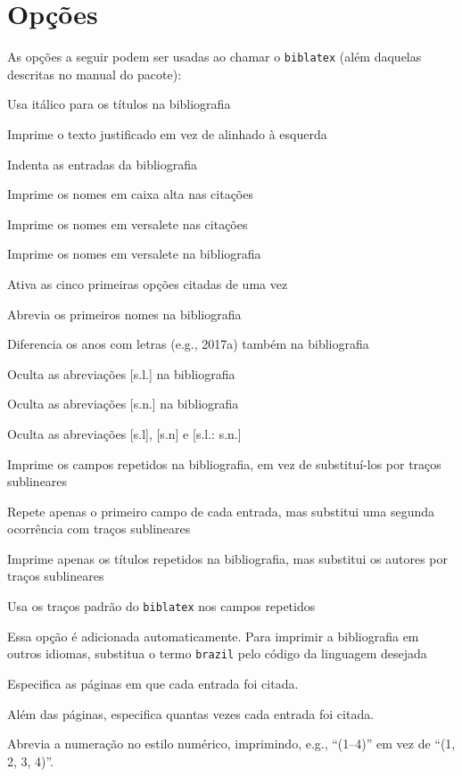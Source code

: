 \documentclass[a4paper]{article}
\begin{document}
\clearpage
\section{Opções}%
\label{sec:opções}

As opções a seguir podem ser usadas ao chamar o \texttt{biblatex} (além
daquelas descritas no manual do pacote):

\begin{description}[itemindent=-1em,leftmargin=3em]%
  \item [ittitles] Usa itálico para os títulos na bibliografia
  \item [justify] Imprime o texto justificado em vez de alinhado à esquerda
  \item [indent] Indenta as entradas da bibliografia
  \item [accite] Imprime os nomes em caixa alta nas citações
  \item [sccite] Imprime os nomes em versalete nas citações
  \item [scbib] Imprime os nomes em versalete na bibliografia
  \item [pretty] Ativa as cinco primeiras opções citadas de uma vez
  \item [giveninits] Abrevia os primeiros nomes na bibliografia
  \item [extrayear] Diferencia os anos com letras (e.g., 2017a)
    também na bibliografia
  \item [nosl] Oculta as abreviações [s.l.] na bibliografia
  \item [nosn] Oculta as abreviações [s.n.] na bibliografia
  \item [noslsn] Oculta as abreviações [s.l], [s.n] e [s.l.: s.n.]
  \item [repeatfields] Imprime os campos repetidos na bibliografia, em vez de
    subs\-ti\-tu\-í-los por traços sublineares
  \item [repeatfirstfields] Repete apenas o primeiro campo de cada entrada,
    mas substitui uma segunda ocorrência com traços sublineares
  \item [repeattitles] Imprime apenas os títulos repetidos na bibliografia,
    mas substitui os autores por traços sublineares
  \item [usedashes] Usa os traços padrão do \texttt{biblatex} nos campos
    repetidos
  \item [language=brazil] Essa opção é adicionada automaticamente. Para
    imprimir a bibliografia em outros idiomas, substitua o termo
    \texttt{brazil} pelo código da linguagem desejada
  \item [backref] Especifica as páginas em que cada entrada foi citada.
  \item [citecount] Além das páginas, especifica quantas vezes cada entrada
    foi citada.
  \item [comp] Abrevia a numeração no estilo numérico, imprimindo, e.g.,
    \enquote{(1--4)} em vez de \enquote{(1, 2, 3, 4)}.
\end{description}%
\end{document}
